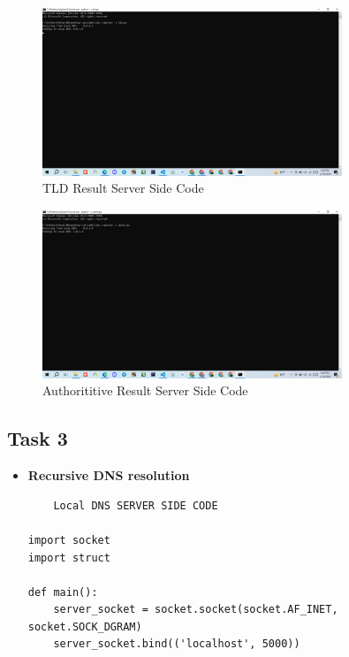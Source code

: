 \documentclass[11pt]{article}
\begin{document}
\begin{itemize}
\begin{itemize}
    \begin{figure}[H]
      \centering
      \includegraphics[width=0.8\textwidth]{Screenshot (172).png}
      \caption{TLD Result Server Side Code}
      \label{fig:4}
    \end{figure}


    \begin{figure}[H]
      \centering
      \includegraphics[width=0.8\textwidth]{Screenshot (173).png}
      \caption{Authorititive Result Server Side Code}
      \label{fig:4}
    \end{figure}

\end{itemize}

\subsection{Task 3}

\begin{itemize}
    \item \textbf{Recursive DNS resolution}
    
    
    \begin{verbatim}
    Local DNS SERVER SIDE CODE
   
import socket
import struct

def main():
    server_socket = socket.socket(socket.AF_INET, socket.SOCK_DGRAM)
    server_socket.bind(('localhost', 5000))


\end{verbatim}
\end{itemize}
\end{itemize}
\end{document}
